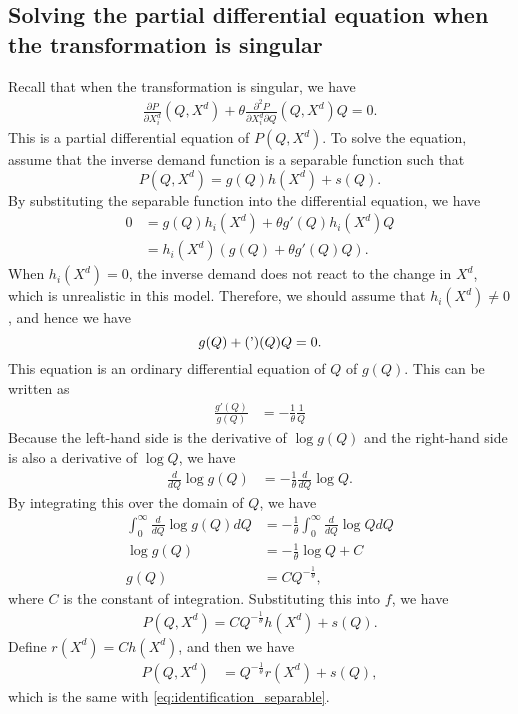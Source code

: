 \documentclass[11pt, a4paper]{article}
\theoremstyle{remark}
\begin{document}
\subsection{Solving the partial differential equation when the transformation is singular}
Recall that when the transformation is singular, we have
\begin{align}
    \frac{\partial P}{\partial X^{d}_{i}}(Q, X^{d}) + \theta \frac{\partial^2 P}{\partial X^{d}_{i}\partial Q}(Q, X^{d})Q = 0.
\end{align}
This is a partial differential equation of $P(Q, X^{d})$.
To solve the equation, assume that the inverse demand function is a separable function such that 
\[P(Q, X^{d}) = g(Q)h(X^{d}) + s(Q).\]
By substituting the separable function into the differential equation, we have 
\begin{align}
   0 & =  g(Q) h_i(X^{d}) + \theta g'(Q)h_i(X^{d}) Q\\
   & = h_i(X^{d})( g(Q) + \theta g'(Q)Q).
\end{align}
When $h_i(X^{d}) = 0$, the inverse demand does not react to the change in $X^{d}$, which is unrealistic in this model.
Therefore, we should assume that $h_i(X^{d}) \ne 0$, and hence we have 
\[g(Q) + \thetag'(Q)Q = 0.\]
This equation is an ordinary differential equation of $Q$ of $g(Q)$.
This can be written as
\begin{align}
    \frac{g'(Q)}{g(Q)} &= -\frac{1}{\theta} \frac{1}{Q}
\end{align}
Because the left-hand side is the derivative of $\log g(Q)$ and the right-hand side is also a derivative of $\log Q$, we have
\begin{align}
        \frac{d}{dQ} \log g(Q) &= -\frac{1}{\theta} \frac{d}{dQ} \log Q.
\end{align}
By integrating this over the domain of $Q$, we have
\begin{align}
    \int_{0}^\infty \frac{d}{dQ} \log g(Q) dQ &= -\frac{1}{\theta} \int_{0}^\infty  \frac{d}{dQ} \log Q dQ \\
    \log g(Q) &= -\frac{1}{\theta} \log Q + C\\
    g(Q) &= C Q^{-\frac{1}{\theta}},
\end{align}
where $C$ is the constant of integration.
Substituting this into $f$, we have 
\begin{align}
    P(Q, X^{d}) = C Q^{-\frac{1}{\theta}} h(X^{d}) + s(Q).
\end{align}
Define $r(X^{d}) = Ch(X^{d})$, and then we have
\begin{align}
    P(Q, X^{d}) &= Q^{-\frac{1}{\theta}} r(X^{d}) + s(Q),
\end{align}
which is the same with \eqref{eq:identification_separable}.
\end{document}
